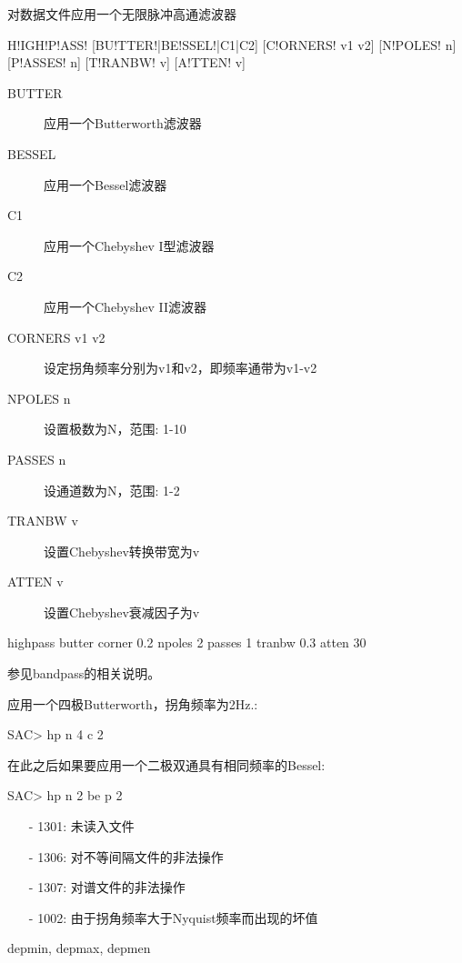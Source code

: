 \label{cmd:highpass}

对数据文件应用一个无限脉冲高通滤波器

\begin{SACSTX}
H!IGH!P!ASS! [BU!TTER!|BE!SSEL!|C1|C2] [C!ORNERS! v1 v2] [N!POLES! n] [P!ASSES! n] 
    [T!RANBW! v] [A!TTEN! v]
\end{SACSTX}

\begin{description}
\item [BUTTER] 应用一个Butterworth滤波器
\item [BESSEL] 应用一个Bessel滤波器
\item [C1] 应用一个Chebyshev I型滤波器
\item [C2] 应用一个Chebyshev II滤波器
\item [CORNERS v1 v2] 设定拐角频率分别为v1和v2，即频率通带为v1-v2
\item [NPOLES n] 设置极数为N，范围: 1-10
\item [PASSES n] 设通道数为N，范围: 1-2
\item [TRANBW v] 设置Chebyshev转换带宽为v
\item [ATTEN v] 设置Chebyshev衰减因子为v
\end{description}

\begin{SACDFT}
highpass butter corner 0.2 npoles 2 passes 1 tranbw 0.3 atten 30
\end{SACDFT}

参见bandpass的相关说明。

应用一个四极Butterworth，拐角频率为2Hz.:
\begin{SACCode}
SAC> hp n 4 c 2
\end{SACCode}

在此之后如果要应用一个二极双通具有相同频率的Bessel:
\begin{SACCode}
SAC> hp n 2 be p 2
\end{SACCode}

\begin{itemize}
\item[-]1301: 未读入文件
\item[-]1306: 对不等间隔文件的非法操作
\item[-]1307: 对谱文件的非法操作
\item[-]1002: 由于拐角频率大于Nyquist频率而出现的坏值
\end{itemize}

depmin, depmax, depmen

